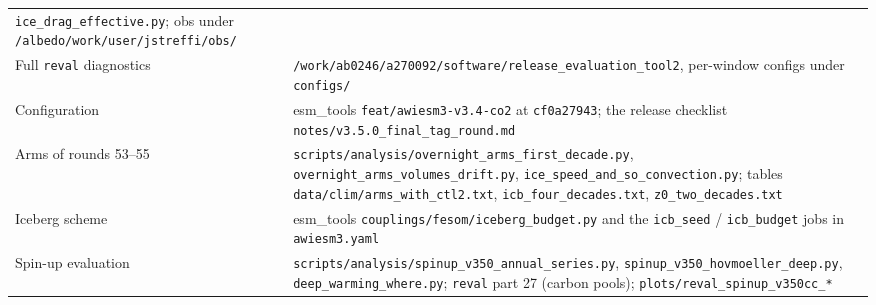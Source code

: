 \documentclass[10pt]{article}
\begin{document}
{\begin{longtable}{p{5.2cm}p{10.8cm}}
\texttt{ice\_drag\_effective.py}; obs under \texttt{/albedo/work/user/jstreffi/obs/} \\
Full \texttt{reval} diagnostics & \texttt{/work/ab0246/a270092/software/release\_evaluation\_tool2},
per-window configs under \texttt{configs/} \\
Configuration & esm\_tools \texttt{feat/awiesm3-v3.4-co2} at \texttt{cf0a27943}; the release
checklist \texttt{notes/v3.5.0\_final\_tag\_round.md} \\
Arms of rounds 53--55 & \texttt{scripts/analysis/overnight\_arms\_first\_decade.py},
\texttt{overnight\_arms\_volumes\_drift.py}, \texttt{ice\_speed\_and\_so\_convection.py};
tables \texttt{data/clim/arms\_with\_ctl2.txt}, \texttt{icb\_four\_decades.txt}, \texttt{z0\_two\_decades.txt} \\
Iceberg scheme & esm\_tools \texttt{couplings/fesom/iceberg\_budget.py} and the \texttt{icb\_seed} /
\texttt{icb\_budget} jobs in \texttt{awiesm3.yaml} \\
Spin-up evaluation & \texttt{scripts/analysis/spinup\_v350\_annual\_series.py},
\texttt{spinup\_v350\_hovmoeller\_deep.py}, \texttt{deep\_warming\_where.py}; \texttt{reval} part 27 (carbon
pools); \texttt{plots/reval\_spinup\_v350cc\_*} \\
\bottomrule
\end{longtable}}
\end{document}
